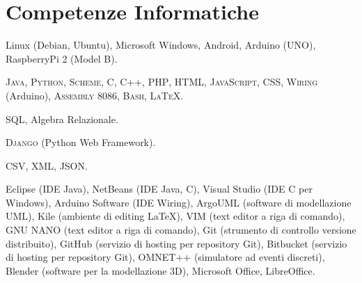 %
%
%
%
%
%



\section{Competenze Informatiche}

{Linux (Debian, Ubuntu), Microsoft Windows, Android, Arduino (UNO), RaspberryPi
2 (Model B).}

{\textsc{Java}, \textsc{Python}, \textsc{Scheme}, \textsc{C}, \textsc{C++},
\textsc{PHP}, \textsc{HTML}, \textsc{JavaScript}, \textsc{CSS}, \textsc{Wiring}
(Arduino), \textsc{Assembly 8086}, \textsc{Bash}, \textsc{\LaTeX}.}

{\textsc{SQL}, Algebra Relazionale.}

{\textsc{Django} (Python Web Framework).}

{\textsc{CSV}, \textsc{XML}, \textsc{JSON}.}

{Eclipse (IDE Java), NetBeans (IDE Java, C), Visual Studio (IDE C per Windows),
Arduino Software (IDE Wiring), ArgoUML (software di modellazione UML), Kile
(ambiente di editing \LaTeX), VIM (text editor a riga di comando), GNU NANO
(text editor a riga di comando), Git (strumento di controllo versione
distribuito), GitHub (servizio di hosting per repository Git), Bitbucket
(servizio di hosting per repository Git), OMNET++ (simulatore ad eventi
discreti), Blender (software per la modellazione 3D), Microsoft Office,
LibreOffice.}
